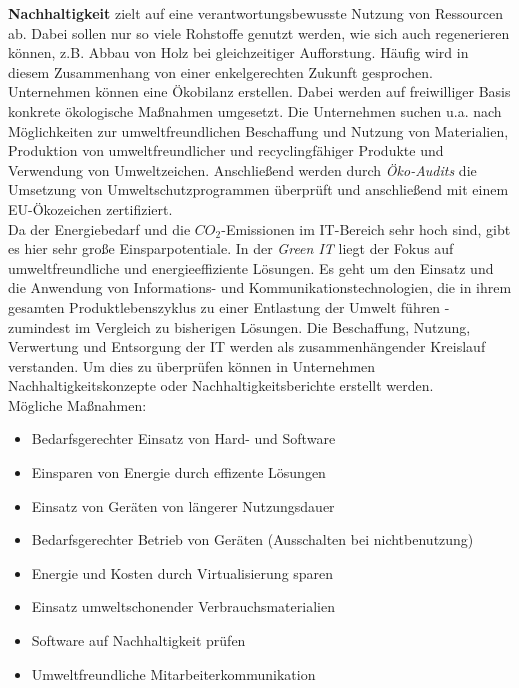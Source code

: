 \documentclass[a4paper, 12pt]{report}
\begin{document}
\textbf{Nachhaltigkeit} zielt auf eine verantwortungsbewusste Nutzung von 
Ressourcen ab. Dabei sollen nur so viele Rohstoffe genutzt werden, wie sich auch 
regenerieren können, z.B. Abbau von Holz bei gleichzeitiger Aufforstung. Häufig 
wird in diesem Zusammenhang von einer enkelgerechten Zukunft gesprochen. \\

Unternehmen können eine Ökobilanz erstellen. Dabei werden auf freiwilliger Basis
konkrete ökologische Maßnahmen umgesetzt. Die Unternehmen suchen u.a. nach 
Möglichkeiten zur umweltfreundlichen Beschaffung und Nutzung von Materialien, 
Produktion von umweltfreundlicher und recyclingfähiger Produkte und Verwendung 
von Umweltzeichen. Anschließend werden durch \emph{Öko-Audits} die Umsetzung von
Umweltschutzprogrammen überprüft und anschließend mit einem EU-Ökozeichen 
zertifiziert. \\

Da der Energiebedarf und die $CO_2$-Emissionen im IT-Bereich sehr hoch sind, 
gibt es hier sehr große Einsparpotentiale. In der \emph{Green IT} liegt der 
Fokus auf umweltfreundliche und energieeffiziente Lösungen. Es geht um den 
Einsatz und die Anwendung von Informations- und Kommunikationstechnologien, die 
in ihrem gesamten Produktlebenszyklus zu einer Entlastung der Umwelt führen - 
zumindest im Vergleich zu bisherigen Lösungen. Die Beschaffung, Nutzung, 
Verwertung und Entsorgung der IT werden als zusammenhängender Kreislauf 
verstanden. Um dies zu überprüfen können in Unternehmen Nachhaltigkeitskonzepte 
oder Nachhaltigkeitsberichte erstellt werden. \\

\newpage
Mögliche Maßnahmen:

\begin{itemize}
    \item Bedarfsgerechter Einsatz von Hard- und Software
    \item Einsparen von Energie durch effizente Lösungen
    \item Einsatz von Geräten von längerer Nutzungsdauer
    \item Bedarfsgerechter Betrieb von Geräten (Ausschalten bei nichtbenutzung)
    \item Energie und Kosten durch Virtualisierung sparen
    \item Einsatz umweltschonender Verbrauchsmaterialien
    \item Software auf Nachhaltigkeit prüfen
    \item Umweltfreundliche Mitarbeiterkommunikation
\end{itemize}
\end{document}
